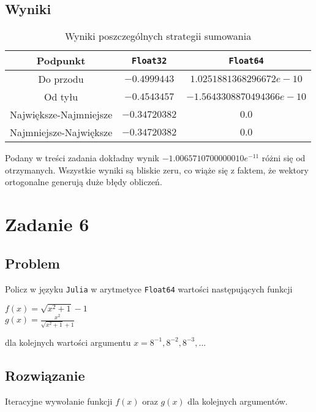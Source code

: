 \documentclass{article}
\begin{document}
        \subsection{Wyniki}
            {\small
            \begin{table}[h!]
            \centering
            \begin{tabular}{c c c}
                \hline
                 Podpunkt & \texttt{Float32} & \texttt{Float64}\\
                 \hline
                 Do przodu & $-0.4999443$ & $1.0251881368296672e-10$ \\
                 Od tyłu & $-0.4543457$ & $-1.5643308870494366e-10$ \\
                 Największe-Najmniejsze & $-0.34720382$ & $0.0$\\
                 Najmniejsze-Największe & $-0.34720382$ & $0.0$ \\
                 \hline
            \end{tabular}
            \caption{Wyniki poszczególnych strategii sumowania}
            \label{table:sums}
            \end{table}
            }
            Podany w treści zadania dokładny wynik $-1.0065710700000010e^{-11}$ różni się od otrzymanych. Wszystkie wyniki są bliskie zeru, co wiąże się z faktem, że wektory ortogonalne generują duże błędy obliczeń.
        
    \section{Zadanie 6}
        \subsection{Problem}
            Policz w języku \texttt{Julia} w arytmetyce \texttt{Float64} wartości następujących funkcji
            \begin{center}
                $f(x) = \sqrt{x^2+1}-1$ \\
                $g(x) = \frac{x^2}{\sqrt{x^2+1}+1}$
            \end{center}
            dla kolejnych wartości argumentu $x = 8^{-1}, 8^{-2}, 8^{-3}, ...$
        \subsection{Rozwiązanie}
            Iteracyjne wywołanie funkcji $f(x)$ oraz $g(x)$ dla kolejnych argumentów.
\end{document}
